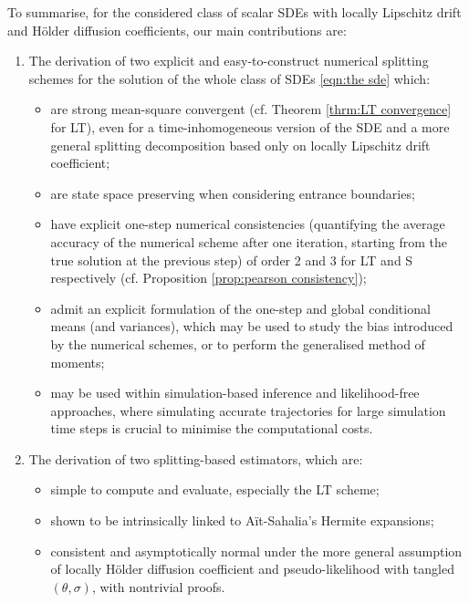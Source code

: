\documentclass[a4paper,12pt]{article}
\numberwithin{equation}{section}
\theoremstyle{plain}
\theoremstyle{definition}
\begin{document}
To summarise, for the considered class of scalar SDEs with locally Lipschitz drift and H\"older diffusion coefficients, our main contributions are:
\begin{enumerate}
    \item The derivation of two explicit and easy-to-construct numerical splitting schemes for the solution of the whole class of SDEs \eqref{eqn:the sde} which:
    \begin{itemize}
        \item[(i)] are strong mean-square convergent (cf. Theorem \eqref{thrm:LT convergence} for LT),  even for a time-inhomogeneous version of the SDE and a more general splitting decomposition based only on locally Lipschitz drift coefficient;
        \item[(ii)] are state space preserving when considering entrance boundaries;
        \item[(iii)] have explicit one-step numerical consistencies (quantifying the 
        average accuracy of the numerical scheme after one iteration, starting from the true solution at the previous step) of order 2 and 3 for LT and S respectively (cf. Proposition \ref{prop:pearson consistency});
        \item[(iv)] admit  an explicit formulation of the one-step and global conditional means (and variances), which may be used to study the bias introduced by the numerical schemes, or to perform the generalised method of moments;
        \item[(v)] may be used within simulation-based inference \cite{cranmer2020frontier} and likelihood-free approaches, where simulating accurate trajectories
for large simulation time steps is crucial to minimise the computational costs.
    \end{itemize}
    \item The derivation of two splitting-based estimators, which are: 
    \begin{itemize}
        \item[(i)] simple to compute and evaluate, especially the LT scheme;
        \item[(ii)] shown to be intrinsically linked to A\"it-Sahalia's Hermite expansions;
        \item[(iii)]  consistent and asymptotically normal under the more general assumption of locally H\"older diffusion coefficient and pseudo-likelihood with tangled $(\theta,\sigma)$, with nontrivial proofs.
    \end{itemize}
\end{enumerate}
 
\end{document}
